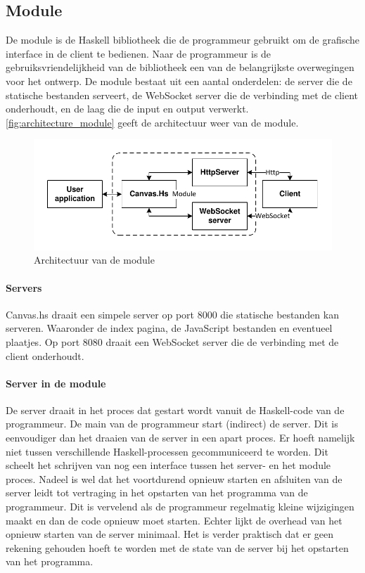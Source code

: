 \subsection{Module} \label{subsec:module}
De module is de Haskell bibliotheek die de programmeur gebruikt om de grafische interface in de client te bedienen. Naar de programmeur is de gebruiksvriendelijkheid van de bibliotheek een van de belangrijkste overwegingen voor het ontwerp. De module bestaat uit een aantal onderdelen: de server die de statische bestanden serveert, de WebSocket server die de verbinding met de client onderhoudt, en de laag die de input en output verwerkt. \autoref{fig:architecture_module} geeft de architectuur weer van de module.

\begin{figure}
\begin{center}
\includegraphics[keepaspectratio,width=\textwidth]{./images/module_architecture.pdf}
\caption{Architectuur van de module}
\label{fig:architecture_module}
\end{center}
\end{figure}

\paragraph{Servers}
Canvas.hs draait een simpele server op port 8000 die statische bestanden kan serveren. Waaronder de index pagina, de JavaScript bestanden en eventueel plaatjes. Op port 8080 draait een WebSocket server die de verbinding met de client onderhoudt.


\paragraph{Server in de module}
De server draait in het proces dat gestart wordt vanuit de Haskell-code van de programmeur. De main van de programmeur start (indirect) de server. Dit is eenvoudiger dan het draaien van de server in een apart proces. Er hoeft namelijk niet tussen verschillende Haskell-processen gecommuniceerd te worden. Dit scheelt het schrijven van nog een interface tussen het server- en het module proces. Nadeel is wel dat het voortdurend opnieuw starten en afsluiten van de server leidt tot vertraging in het opstarten van het programma van de programmeur. Dit is vervelend als de programmeur regelmatig kleine wijzigingen maakt en dan de code opnieuw moet starten. Echter lijkt de overhead van het opnieuw starten van de server minimaal. Het is verder praktisch dat er geen rekening gehouden hoeft te worden met de state van de server bij het opstarten van het programma.

